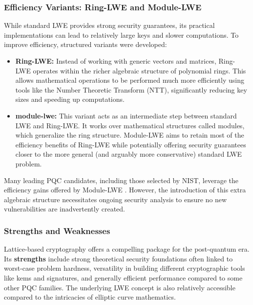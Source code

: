 \subsubsection{Efficiency Variants: Ring-LWE and Module-LWE}
While standard LWE provides strong security guarantees, its practical implementations can lead to relatively large keys and slower computations. To improve efficiency, structured variants were developed:
\begin{itemize}
    \item \textbf{Ring-LWE:} Instead of working with generic vectors and matrices, Ring-LWE operates within the richer algebraic structure of polynomial rings. This allows mathematical operations to be performed much more efficiently using tools like the Number Theoretic Transform (NTT), significantly reducing key sizes and speeding up computations.
    \item \textbf{\Gls{module-lwe}:} This variant acts as an intermediate step between standard LWE and Ring-LWE. It works over mathematical structures called modules, which generalize the ring structure. Module-LWE aims to retain most of the efficiency benefits of Ring-LWE while potentially offering security guarantees closer to the more general (and arguably more conservative) standard LWE problem.
\end{itemize}
Many leading PQC candidates, including those selected by NIST, leverage the efficiency gains offered by Module-LWE \parencite{lattice_theory_2024}. However, the introduction of this extra algebraic structure necessitates ongoing security analysis to ensure no new vulnerabilities are inadvertently created.
\newpage

\subsubsection{Strengths and Weaknesses}
Lattice-based cryptography offers a compelling package for the post-quantum era. Its \textbf{strengths} include strong theoretical security foundations often linked to worst-case problem hardness, versatility in building different cryptographic tools like \glspl{kem} and signatures, and generally efficient performance compared to some other PQC families. The underlying LWE concept is also relatively accessible compared to the intricacies of elliptic curve mathematics.


